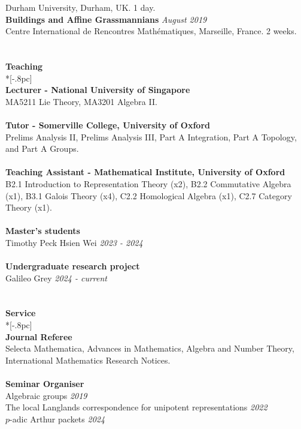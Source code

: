 \documentclass{article}
\begin{document}
Durham University, Durham, UK. 1 day.\\
{\bf Buildings and Affine Grassmannians } \hfill {\it August 2019 \/} \\
Centre International de Rencontres Mathématiques, Marseille, France. 2 weeks.\\
\\
\\
{\large \bf Teaching} \\*[-.8pc]
\underline{\hspace{0.9in}} \\
{\bf Lecturer - National University of Singapore}  \\
MA5211 Lie Theory, MA3201 Algebra II. \\
\\
{\bf Tutor - Somerville College, University of Oxford}  \\
Prelims Analysis II, Prelims Analysis III, Part A Integration, Part A Topology, and Part A Groups. \\
\\
{\bf Teaching Assistant - Mathematical Institute, University of Oxford}  \\
B2.1 Introduction to Representation Theory (x2), B2.2 Commutative Algebra (x1), B3.1 Galois Theory (x4), C2.2 Homological Algebra (x1), C2.7 Category Theory (x1).\\
\\
{\bf Master's students}  \\
{Timothy Peck Hsien Wei} \hfill {\it 2023 - 2024 \/} \\
\\
{\bf Undergraduate research project}  \\
{Galileo Grey} \hfill {\it 2024 - current \/} \\
\\
\\

{\large \bf Service} \\*[-.8pc]
\underline{\hspace{0.9in}} \\
{\bf Journal Referee}  \\
Selecta Mathematica, Advances in Mathematics, Algebra and Number Theory, International Mathematics Research Notices.\\
\\
{\bf Seminar Organiser}  \\
Algebraic groups \hfill {\it 2019} \\
The local Langlands correspondence for unipotent representations \hfill {\it 2022}\\
$p$-adic Arthur packets \hfill {\it 2024}\\
\\
\\
\end{document}
